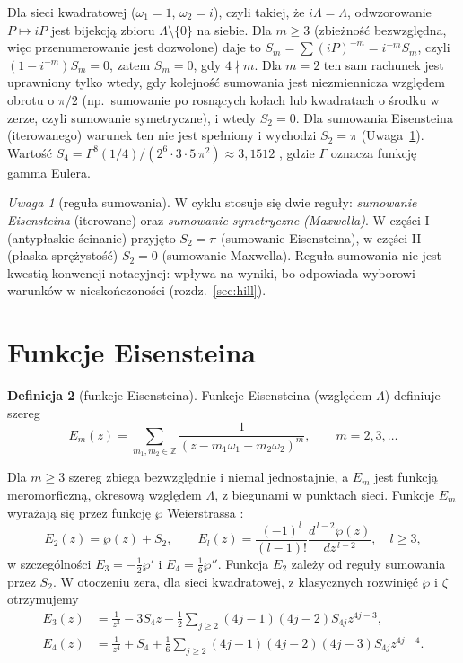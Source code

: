 \documentclass[12pt,a4paper,twoside,openright]{report}
\theoremstyle{definition}
\newtheorem{definicja}{Definicja}[chapter]
\theoremstyle{remark}
\newtheorem{uwaga}[definicja]{Uwaga}
\newcommand{\Z}{\mathbb{Z}}
\begin{document}
Dla sieci kwadratowej ($\omega_1=1$, $\omega_2=i$), czyli takiej, że $i\Lambda=\Lambda$, odwzorowanie $P\mapsto iP$ jest bijekcją zbioru $\Lambda\setminus\{0\}$ na siebie. Dla $m\ge3$ (zbieżność bezwzględna, więc przenumerowanie jest dozwolone) daje to $S_m=\sum(iP)^{-m}=i^{-m}S_m$, czyli $(1-i^{-m})S_m=0$, zatem $S_m=0$, gdy $4\nmid m$. Dla $m=2$ ten sam rachunek jest uprawniony tylko wtedy, gdy kolejność sumowania jest niezmiennicza względem obrotu o $\pi/2$ (np.\ sumowanie po rosnących kołach lub kwadratach o środku w zerze, czyli sumowanie symetryczne), i wtedy $S_2=0$. Dla sumowania Eisensteina (iterowanego) warunek ten nie jest spełniony i wychodzi $S_2=\pi$ (Uwaga~\ref{rem:sum}). Wartość $S_4=\Gamma^8(1/4)/(2^6\cdot3\cdot5\,\pi^2)\approx3{,}1512$ \cite{czapla2025computational}, gdzie $\Gamma$ oznacza funkcję gamma Eulera.

\begin{uwaga}[reguła sumowania]\label{rem:sum}
W cyklu \cite{mityushev2025computational,czapla2025computational,mityushev2025computationalpart3} stosuje się dwie reguły: \emph{sumowanie Eisensteina} (iterowane) oraz \emph{sumowanie symetryczne (Maxwella)}. W części I (antypłaskie ścinanie) przyjęto $S_2=\pi$ (sumowanie Eisensteina), w części II (płaska sprężystość) $S_2=0$ (sumowanie Maxwella). Reguła sumowania nie jest kwestią konwencji notacyjnej: wpływa na wyniki, bo odpowiada wyborowi warunków w nieskończoności (rozdz.~\ref{sec:hill}).
\end{uwaga}

\section{Funkcje Eisensteina}

\begin{definicja}[funkcje Eisensteina]\label{def:E}
Funkcje Eisensteina (względem $\Lambda$) definiuje szereg
\begin{equation}\label{eq:Em}
E_m(z)=\sum_{m_1,m_2\in\Z}\frac{1}{(z-m_1\omega_1-m_2\omega_2)^m},\qquad m=2,3,\dots
\end{equation}
\end{definicja}

Dla $m\ge3$ szereg zbiega bezwzględnie i niemal jednostajnie, a $E_m$ jest funkcją meromorficzną, okresową względem $\Lambda$, z biegunami w punktach sieci. Funkcje $E_m$ wyrażają się przez funkcję $\wp$ Weierstrassa \cite{weil1999elliptic}:
\begin{equation}\label{eq:EWeier}
E_2(z)=\wp(z)+S_2,\qquad E_l(z)=\frac{(-1)^l}{(l-1)!}\frac{d^{\,l-2}\wp(z)}{dz^{\,l-2}},\quad l\ge3,
\end{equation}
w szczególności $E_3=-\tfrac12\wp'$ i $E_4=\tfrac16\wp''$. Funkcja $E_2$ zależy od reguły sumowania przez $S_2$. W otoczeniu zera, dla sieci kwadratowej, z klasycznych rozwinięć $\wp$ i $\zeta$ \cite{czapla2025computational} otrzymujemy
\begin{align}
E_3(z)&=\frac1{z^3}-3S_4z-\frac12\sum_{j\ge2}(4j-1)(4j-2)S_{4j}z^{4j-3},\label{eq:E3exp}\\
E_4(z)&=\frac1{z^4}+S_4+\frac16\sum_{j\ge2}(4j-1)(4j-2)(4j-3)S_{4j}z^{4j-4}.\label{eq:E4exp}
\end{align}
\end{document}
